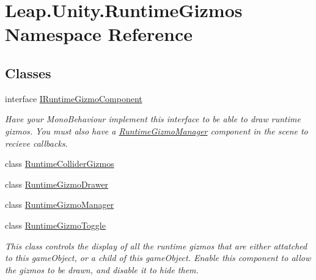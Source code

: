 \hypertarget{namespace_leap_1_1_unity_1_1_runtime_gizmos}{}\section{Leap.\+Unity.\+Runtime\+Gizmos Namespace Reference}
\label{namespace_leap_1_1_unity_1_1_runtime_gizmos}
\subsection*{Classes}
\begin{DoxyCompactItemize}
\item 
interface \mbox{\hyperlink{interface_leap_1_1_unity_1_1_runtime_gizmos_1_1_i_runtime_gizmo_component}{I\+Runtime\+Gizmo\+Component}}
\begin{DoxyCompactList}\small\item\em Have your Mono\+Behaviour implement this interface to be able to draw runtime gizmos. You must also have a \mbox{\hyperlink{class_leap_1_1_unity_1_1_runtime_gizmos_1_1_runtime_gizmo_manager}{Runtime\+Gizmo\+Manager}} component in the scene to recieve callbacks. \end{DoxyCompactList}\item 
class \mbox{\hyperlink{class_leap_1_1_unity_1_1_runtime_gizmos_1_1_runtime_collider_gizmos}{Runtime\+Collider\+Gizmos}}
\item 
class \mbox{\hyperlink{class_leap_1_1_unity_1_1_runtime_gizmos_1_1_runtime_gizmo_drawer}{Runtime\+Gizmo\+Drawer}}
\item 
class \mbox{\hyperlink{class_leap_1_1_unity_1_1_runtime_gizmos_1_1_runtime_gizmo_manager}{Runtime\+Gizmo\+Manager}}
\item 
class \mbox{\hyperlink{class_leap_1_1_unity_1_1_runtime_gizmos_1_1_runtime_gizmo_toggle}{Runtime\+Gizmo\+Toggle}}
\begin{DoxyCompactList}\small\item\em This class controls the display of all the runtime gizmos that are either attatched to this game\+Object, or a child of this game\+Object. Enable this component to allow the gizmos to be drawn, and disable it to hide them. \end{DoxyCompactList}\end{DoxyCompactItemize}
